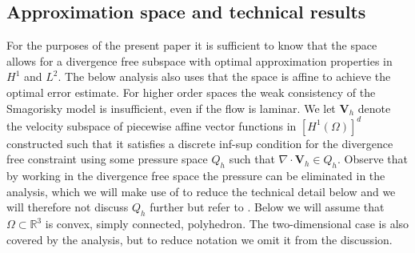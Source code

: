 \documentclass[10pt]{amsart}
\numberwithin{equation}{section}
\theoremstyle{definition}
\theoremstyle{remark}
\renewcommand{\(}{\bigl(}
\renewcommand{\)}{\bigr)}
\newcommand{\bld}[1]{\boldsymbol{#1}}
\newcommand{\bV}{\bld{V}}
\begin{document}


\subsection{Approximation space and technical results}
For the purposes of the
present paper it is sufficient to know that the space allows for a
divergence free subspace with optimal approximation properties in
$H^1$ and $L^2$. The below analysis also uses that the space is affine
to achieve the optimal error estimate. For higher order
spaces the weak consistency of the Smagorisky model is insufficient,
even if the flow is laminar. We let $\bV_h $ denote the velocity subspace of piecewise
affine vector functions in $[H^1(\Omega)]^d$ constructed such that it
satisfies a discrete inf-sup condition for the divergence free
constraint using some pressure space $Q_h$ such that $\nabla \cdot \bV_h \in Q_h$. Observe that by working in the divergence free space the
pressure can be eliminated in the analysis, which we will make use of
to reduce the technical detail below and we will therefore not discuss
$Q_h$ further but refer to \cite{CH18,GN18}. Below we will assume that
$\Omega \subset \mathbb{R}^3$ is convex, simply connected,
polyhedron. The two-dimensional case is also covered by the analysis,
but to reduce notation we omit it from the discussion.
\end{document}
